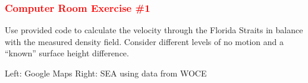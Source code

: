\documentclass[xcolor=dvipsnames]{beamer}
\begin{document}
\begin{frame}
\frametitle{\textcolor{red}{Computer Room Exercise \#1}}

 Use provided code to calculate the velocity through the Florida Straits in balance with the measured density field. Consider different levels of no motion and a ``known'' surface height difference.


{\small Left: Google Maps Right: SEA using data from WOCE}
\label{florida_straits_1}
\end{frame}
\end{document}
